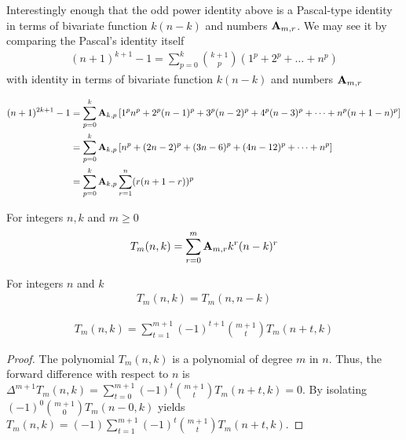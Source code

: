 Interestingly enough that the odd power identity above is a Pascal-type identity
in terms of bivariate function $k(n-k)$ and numbers ${\mathbf{A}} \sb{m,r}$.
We may see it by comparing the Pascal's identity itself~\cite{macmillan2011proofs}
\begin{align*}
(n+1)
    ^{k+1}-1=\sum _{p=0}^{k}{\binom {k+1}{p}}(1^{p}+2^{p}+\dots +n^{p})
\end{align*}
with identity in terms of bivariate function $k(n-k)$ and numbers ${\mathbf{A}} \sb{m,r}$
\begin{corollary}
    \begin{align*}
    (n+1)
        ^{2k+1} - 1
        &= \sum_{p=0}^{k} {\mathbf{A}} \sb{k,p} \left[ 1^p n^p + 2^p (n-1)^p + 3^p (n-2)^p + 4^p (n-3)^p + \cdots +  n^p (n+1-n)^p  \right] \\
        &= \sum_{p=0}^{k} {\mathbf{A}} \sb{k,p} \left[ n^p + (2n-2)^p + (3n-6)^p + (4n-12)^p + \cdots +  n^p  \right] \\
        &= \sum_{p=0}^{k} {\mathbf{A}} \sb{k,p} \sum_{r=1}^{n} (r (n+1-r))^p
    \end{align*}
\end{corollary}
\begin{definition}
    For integers $n,k$ and $m \geq 0$
    \label{def:bivariate-sum-Tm}
    \begin{align*}
        T_{m}(n,k) = \sum_{r=0}^{m} {\mathbf{A}} \sb{m,r} k^r (n-k)^r
    \end{align*}
\end{definition}

\begin{proposition}[Symmetry of $T_m$]
    \label{prop:Tm-symmetry}
    For integers $n$ and $k$
    \begin{align*}
        T_{m} (n, k) = T_{m} (n, n-k)
    \end{align*}
\end{proposition}
\begin{proposition}
    \label{prop:Tm-recurrence-forward}
    \begin{align*}
        T_{m} (n,k) = \sum_{t=1}^{m+1} (-1)^{t+1} \binom{m+1}{t} T_{m} (n+t, k)
    \end{align*}
    \begin{proof}
        The polynomial $T_{m} (n,k)$ is a polynomial of degree $m$ in $n$.
        Thus, the forward difference with respect to $n$ is
        $\Delta^{m+1} T_{m} (n, k) = \sum_{t=0}^{m+1} (-1)^{t} \binom{m+1}{t} T_{m} (n+t, k) = 0$.
        By isolating $(-1)^{0} \binom{m+1}{0} T_{m} (n-0, k)$ yields
        $T_{m} (n, k) = (-1) \sum_{t=1}^{m+1} (-1)^{t} \binom{m+1}{t} T_{m} (n+t, k)$.
    \end{proof}
\end{proposition}


